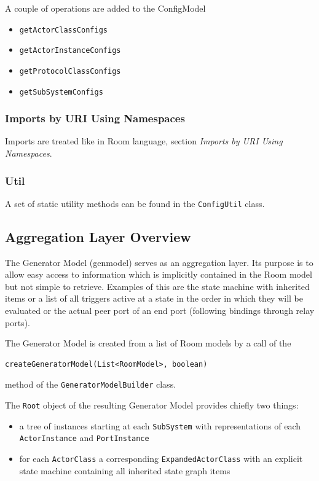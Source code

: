 A couple of operations are added to the ConfigModel
\begin{itemize}
\item \texttt{getActorClassConfigs}
\item \texttt{getActorInstanceConfigs}
\item \texttt{getProtocolClassConfigs}
\item \texttt{getSubSystemConfigs}
\end{itemize}

\subsubsection{Imports by URI Using Namespaces}

Imports are treated like in Room language, section \textit{Imports by URI Using Namespaces}.

\subsubsection{Util}

A set of static utility methods can be found in the \texttt{ConfigUtil} class.

\subsection{Aggregation Layer Overview}

The \eTrice{} Generator Model (genmodel) serves as an aggregation layer. Its purpose is to allow easy access 
to information which is implicitly contained in the Room model but not simple to retrieve.
Examples of this are the state machine with inherited items or a list of all triggers active at a state in 
the order in which they will be evaluated or the actual peer port of an end port (following bindings 
through relay ports).

The Generator Model is created from a list of Room models by a call of the

\begin{verbatim}createGeneratorModel(List<RoomModel>, boolean)\end{verbatim}

method of the \texttt{GeneratorModelBuilder} class.

The \texttt{Root} object of the resulting Generator Model provides chiefly two things:
\begin{itemize}
\item a tree of instances starting at each \texttt{SubSystem} with representations of each 
\texttt{ActorInstance} and \texttt{PortInstance}
\item for each \texttt{ActorClass} a corresponding \texttt{ExpandedActorClass} with an explicit state 
machine containing all inherited state graph items
\end{itemize}

